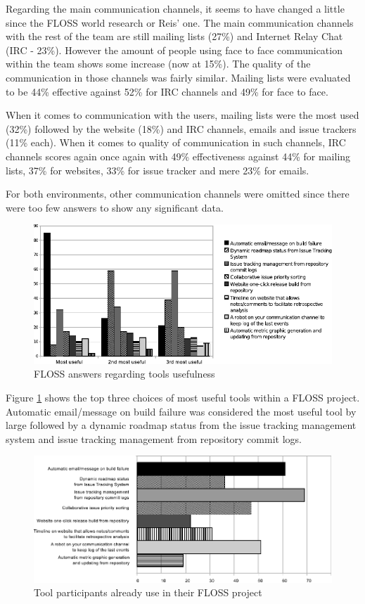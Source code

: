 \documentclass[lnbip]{svmultln}
\begin{document}
Regarding the main communication channels, it seems to have changed a
little since the FLOSS world research or Reis' one. The main
communication channels with the rest of the team are still mailing
lists (27\%) and Internet Relay Chat (IRC - 23\%). However the amount
of people using face to face communication within the team shows some
increase (now at 15\%). The quality of the communication in those
channels was fairly similar. Mailing lists were evaluated to be 44\%
effective against 52\% for IRC channels and 49\% for face to face.

When it comes to communication with the users, mailing lists were the
most used (32\%) followed by the website (18\%) and IRC channels,
emails and issue trackers (11\% each). When it comes to quality of
communication in such channels, IRC channels scores again once again
with 49\% effectiveness against 44\% for mailing lists, 37\% for
websites, 33\% for issue tracker and mere 23\% for emails.

For both environments, other communication channels were omitted since
there were too few answers to show any significant data.

\begin{figure}[htb]
  \centering
  \includegraphics{floss-tools.pdf}
  \caption{FLOSS answers regarding tools usefulness}
  \label{fig:floss-tools}
\end{figure}

Figure \ref{fig:floss-tools} shows the top three choices of most
useful tools within a FLOSS project. Automatic email/message on build
failure was considered the most useful tool by large followed by a
dynamic roadmap status from the issue tracking management system and
issue tracking management from repository commit logs.

\begin{figure}[hbt]
  \centering
  \includegraphics[scale=.8]{floss-existingtools.pdf}
  \caption{Tool participants already use in their FLOSS project}
  \label{fig:floss-existingtools}
\end{figure}
\end{document}
